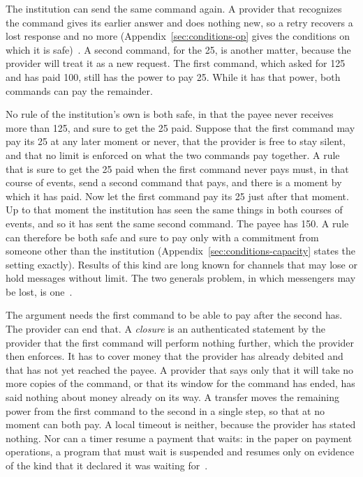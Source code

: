 \documentclass{momentum}
\begin{document}
The institution can send the same command again. A provider that recognizes the command gives its earlier answer and does nothing new, so a retry recovers a lost response and no more (Appendix~\ref{sec:conditions-op} gives the conditions on which it is safe)~\cite[Section~5.12]{op}. A second command, for the 25, is another matter, because the provider will treat it as a new request. The first command, which asked for 125 and has paid 100, still has the power to pay 25. While it has that power, both commands can pay the remainder.

No rule of the institution's own is both safe, in that the payee never receives more than 125, and sure to get the 25 paid. Suppose that the first command may pay its 25 at any later moment or never, that the provider is free to stay silent, and that no limit is enforced on what the two commands pay together. A rule that is sure to get the 25 paid when the first command never pays must, in that course of events, send a second command that pays, and there is a moment by which it has paid. Now let the first command pay its 25 just after that moment. Up to that moment the institution has seen the same things in both courses of events, and so it has sent the same second command. The payee has 150. A rule can therefore be both safe and sure to pay only with a commitment from someone other than the institution (Appendix~\ref{sec:conditions-capacity} states the setting exactly). Results of this kind are long known for channels that may lose or hold messages without limit. The two generals problem, in which messengers may be lost, is one~\cite{gray78}.

The argument needs the first command to be able to pay after the second has. The provider can end that. A \emph{closure} is an authenticated statement by the provider that the first command will perform nothing further, which the provider then enforces. It has to cover money that the provider has already debited and that has not yet reached the payee. A provider that says only that it will take no more copies of the command, or that its window for the command has ended, has said nothing about money already on its way. A transfer moves the remaining power from the first command to the second in a single step, so that at no moment can both pay. A local timeout is neither, because the provider has stated nothing. Nor can a timer resume a payment that waits: in the paper on payment operations, a program that must wait is suspended and resumes only on evidence of the kind that it declared it was waiting for~\cite[Sections~3 and~4]{op}.
\end{document}
